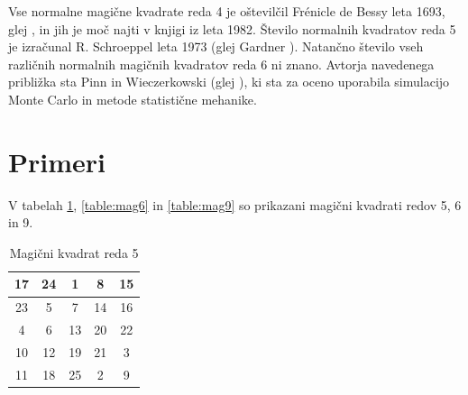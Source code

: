 \documentclass[a4paper,12pt]{article}
\theoremstyle{definition}
\theoremstyle{plain}
\newenvironment{magic}[3]
   {\begin{table}[!ht]
      \centering
      \caption{#2}
      \label{#3}
      \begin{tabular}{|*{#1}{c|}}
   }
   {\end{tabular}
      \end{table}}
\begin{document}
Vse normalne magične kvadrate reda 4 je oštevilčil Frénicle de Bessy
leta 1693, glej \cite{bessy}, in jih je moč najti v knjigi \cite{berlekamp}
iz leta 1982. Število normalnih kvadratov reda 5 je izračunal
R. Schroeppel leta 1973 (glej Gardner \cite{gardner}).
Natančno število vseh različnih normalnih magičnih kvadratov reda 6 ni znano.
Avtorja navedenega približka sta Pinn in Wieczerkowski (glej \cite{pinn}), ki
sta za oceno uporabila simulacijo Monte Carlo in metode statistične mehanike.


\section{Primeri}

V tabelah \ref{table:mag5}, \ref{table:mag6} in \ref{table:mag9} so prikazani
magični kvadrati redov 5, 6 in 9. %

\begin{magic}{5}{Magični kvadrat reda 5}{table:mag5}
   \hline
   17 & 24 & 1 & 8 & 15 \\ \hline
   23 & 5 & 7 & 14 & 16 \\ \hline
   4 & 6 & 13 & 20 & 22 \\ \hline
   10 & 12 & 19 & 21 & 3 \\ \hline
   11 & 18 & 25 & 2 & 9\\ \hline
\end{magic}
\end{document}
